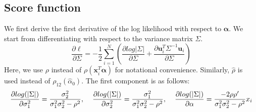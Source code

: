 \documentclass[aoas,authoryear, preprint]{imsart}
\numberwithin{equation}{section}
\theoremstyle{plain}
\begin{document}
\subsection*{Score function}
We first derive the first derivative of the log likelihood with respect to $\bm{\alpha}$. We start from differentiating with respect to the variance matrix $\Sigma$. 
$$\frac{\partial \ell} {\partial \Sigma} =
-\frac{1}{2} \sum_{i=1}^{N} \left(
\frac{\partial log|\Sigma|}{\partial \Sigma} + 
\frac{\partial \bm{u}_i^T \Sigma^{-1}\bm{u}_i}{\partial \Sigma}
\right)
$$
Here, we use $\rho$ instead of $\rho(\bm{x}_i^T\bm{\alpha})$ for notational convenience. Similarly, $\hat{\rho}$ is used instead of ${\rho}_{12}(\hat{\alpha}_0).$
The first component is as follows:
$$\frac{\partial log(|\Sigma|)}{\partial \sigma_1^2}=
\frac{\sigma_2^2}{\sigma_1^2\sigma_2^2 - \rho^2}, \hspace{4mm}
\frac{\partial log(|\Sigma|)}{\partial \sigma_2^2} = \frac{\sigma_1^2}{\sigma_1^2\sigma_2^2 - \rho^2}, \hspace{4mm}
\frac{\partial log(|\Sigma|)}{\partial \alpha} =  \frac{-2\rho\rho'}{\sigma_1^2\sigma_2^2 - \rho^2}x_i$$
\end{document}
